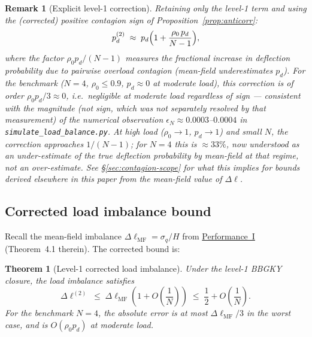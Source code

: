 \documentclass[11pt,a4paper]{report}
\newtheorem{theorem}{Theorem}[section]
\newtheorem{remark}{Remark}[section]
\newcommand{\pd}{p_d}
\begin{document}
\begin{remark}[Explicit level-1 correction]
Retaining only the level-1 term and using the (corrected) positive
contagion sign of Proposition~\ref{prop:anticorr}:
\begin{equation}
  \pd^{(2)}
  \;\approx\; \pd\Bigl(1 + \frac{\rho_0\,\pd}{N-1}\Bigr),
  \label{eq:pd-level1}
\end{equation}
where the factor $\rho_0\pd/(N-1)$ measures the fractional \emph{increase}
in deflection probability due to pairwise overload contagion (mean-field
underestimates $\pd$). For the benchmark ($N=4$, $\rho_0 \leq 0.9$,
$\pd \approx 0$ at moderate load), this correction is of order
$\rho_0\pd/3 \approx 0$, i.e.\ negligible at moderate load regardless of
sign --- consistent with the magnitude (not sign, which was not
separately resolved by that measurement) of the numerical observation
$\epsilon_N \approx 0.0003$--$0.0004$ in
\texttt{simulate\_load\_balance.py}.
At high load ($\rho_0 \to 1$, $\pd \to 1$) and small $N$,
the correction approaches $1/(N-1)$; for $N=4$ this is $\approx 33\%$,
now understood as an \emph{under}-estimate of the true deflection
probability by mean-field at that regime, not an over-estimate. See
\S\ref{sec:contagion-scope} for what this implies for bounds derived
elsewhere in this paper from the mean-field value of $\Delta\ell$.
\end{remark}

\subsection{Corrected load imbalance bound}

Recall the mean-field imbalance $\Delta\ell_{\mathrm{MF}} = \sigma_q/H$
from \hyperref[chap:load_balance]{Performance~I} (Theorem~4.1 therein).
The corrected bound is:

\begin{theorem}[Level-1 corrected load imbalance]
\label{thm:corrected-imbalance}
Under the level-1 BBGKY closure, the load imbalance satisfies
\begin{equation}
  \Delta\ell^{(2)}
  \;\leq\; \Delta\ell_{\mathrm{MF}}\!
  \left(1 + O\!\left(\frac{1}{N}\right)\right)
  \;\leq\; \frac{1}{2} + O\!\left(\frac{1}{N}\right).
\end{equation}
For the benchmark $N = 4$, the absolute error is at most
$\Delta\ell_{\mathrm{MF}} / 3$ in the worst case, and is
$O(\rho_0\pd)$ at moderate load.
\end{theorem}
\end{document}
